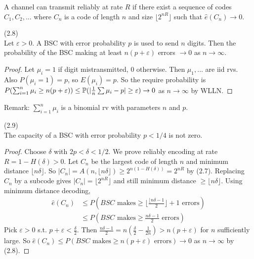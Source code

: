 \documentclass[a4paper]{article}
\begin{document}
\begin{defi}
A channel can transmit reliably at rate $R$ if there exist a sequence of codes $C_1,C_2,...$ where $C_n$ is a code of length $n$ and size $\lfloor 2^{nR}\rfloor$ such that $\hat{e}(C_n) \to 0$.
\end{defi}

\begin{lemma} (2.8)\\
Let $\varepsilon>0$. A BSC with error probability $p$ is used to send $n$ digits. Then the probability of the BSC making at least $n(p+\varepsilon)$ errors $\to 0$ as $n \to \infty$.
\begin{proof}
Let $\mu_i = 1$ if digit mistransmitted, $0$ otherwise. Then $\mu_1,...$ are iid rvs. Also $P(\mu_i=1) = p$, so $E(\mu_i) = p$. So the require probability is $P(\sum_{i=1}^n \mu_i \geq n(p+\varepsilon)) \leq \P(|\frac{1}{n} \sum \mu_i-p| \geq \varepsilon) \to 0$ as $n \to \infty$ by WLLN.
\end{proof}
\end{lemma}

Remark: $\sum_{i=1}^n \mu_i$ is a binomial rv with parameters $n$ and $p$.

\begin{prop} (2.9)\\
The capacity of a BSC with error probability $p<1/4$ is not zero.
\begin{proof}
Choose $\delta$ with $2p < \delta < 1/2$. We prove reliably encoding at rate $R=1-H(\delta)>0$. Let $C_n$ be the largest code of length $n$ and minimum distance $\lfloor n\delta\rfloor$. So $|C_n| = A(n,\lfloor n\delta\rfloor) \geq 2^{n(1-H(\delta))} = 2^{nR}$ by (2.7). Replacing $C_n$ by a subcode gives $|C_n| = \lfloor 2^{nR}\rfloor$ and still minimum distance $\geq \lfloor n\delta\rfloor$. Using minimum distance decoding,
\begin{equation*}
\begin{aligned}
\hat{e}(C_n) &\leq P(BSC \text{ makes} \geq \lfloor \frac{\lfloor n\delta-1}{2}\rfloor+1 \text{ errors} )\\
&\leq P(BSC \text{ makes} \geq \frac{n\delta-1}{2} \text{ errors})
\end{aligned}
\end{equation*}
Pick $\varepsilon > 0$ s.t. $p+\varepsilon < \frac{\delta}{2}$. Then $\frac{n\delta-1}{2} = n(\frac{\delta}{2}-\frac{1}{2n}) > n(p+\varepsilon)$ for $n$ sufficiently large. So $\hat{e}(C_n) \leq P(BSC \text{ makes} \geq n(p+\varepsilon) \text{ errors}) \to 0$ as $n \to \infty$ by (2.8).
\end{proof}
\end{prop}
\end{document}
